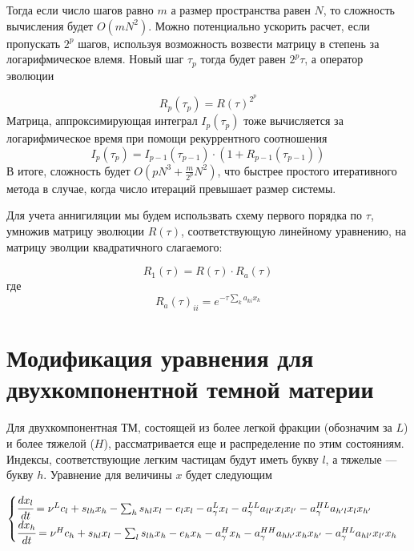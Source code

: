 Тогда если число шагов равно $m$ а размер пространства равен $N$, то сложность вычисления будет $O(mN^2)$.
Можно потенциально ускорить расчет, если пропускать $2^p$ шагов, используя возможность возвести матрицу в степень за логарифмическое влемя. Новый шаг $\tau_p$ тогда будет равен $2^p \tau$, а оператор эволюции 

\begin{equation}
	R_p(\tau_p) = R(\tau)^{2^p}
\end{equation}
Матрица, аппроксимирующая интеграл $I_p(\tau_p)$ тоже вычисляется за логарифмическое время при помощи рекуррентного соотношения
\begin{equation}
	I_p(\tau_p) = I_{p-1}(\tau_{p-1})\cdot (1 + R_{p-1}(\tau_{p-1}))
\end{equation}
В итоге, сложность будет $O(p N^3 + \frac{m}{2^p}N^2)$, что быстрее простого итеративного метода в случае, когда число итераций превышает размер системы.

Для учета аннигиляции мы будем использвать схему первого порядка по $\tau$, умножив матрицу эволюции $R(\tau)$, соответствующую линейному уравнению, на матрицу эволции квадратичного слагаемого:

\begin{equation}
	R_1(\tau) = R(\tau)\cdot R_a(\tau)
\end{equation}
где
\begin{equation}
	R_a(\tau)_{ii} = e^{-\tau\sum_k{a_{ki}x_k}}
\end{equation}

\section{Модификация уравнения для двухкомпонентной темной материи}

Для двухкомпонентная ТМ, состоящей из более легкой фракции (обозначим за $L$) и более тяжелой ($H$), рассматривается еще и распределение по этим состояниям. Индексы, соответствующие легким частицам будут иметь букву $l$, а тяжелые --- букву $h$. Уравнение для величины $x$ будет следующим

\begin{equation}
	\label{eq:evolution_inelastic}
	\begin{cases}
		\cfrac{d x_l}{d t} = \nu^L c_l + s_{lh} x_h - \sum_h{s_{hl}}x_l - e_l x_l - a_{\gamma}^{L} x_l - a_{\gamma}^{LL} a_{l l'} x_l x_{l'}  - a_{\gamma}^{HL} a_{h' l} x_l x_{h'}\\
		\cfrac{d x_h}{d t} = \nu^H c_h + s_{hl} x_l - \sum_l{s_{lh}}x_h - e_h x_h - a_{\gamma}^{H} x_h
		- a_{\gamma}^{HH} a_{h h'} x_h x_{h'}  - a_{\gamma}^{HL} a_{h l'} x_{l'} x_{h}\\
	\end{cases}
\end{equation}

